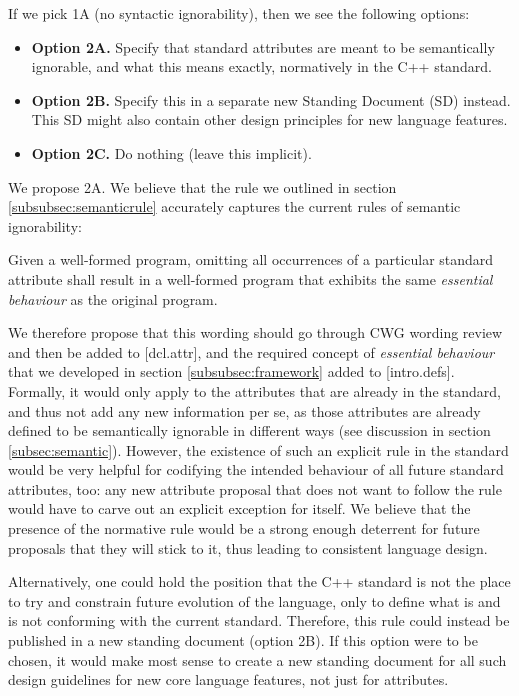 If we pick 1A (no syntactic ignorability), then we see the following options:

\begin{itemize}
\item \textbf{Option 2A.} Specify that standard attributes are meant to be semantically ignorable, and what this means exactly, normatively in the C++ standard.
\item \textbf{Option 2B.} Specify this in a separate new Standing Document (SD) instead. This SD might also contain other design principles for new language features.
\item \textbf{Option 2C.} Do nothing (leave this implicit).
\end{itemize}

We propose 2A. We believe that the rule we outlined in section \ref{subsubsec:semanticrule} accurately captures the current rules of semantic ignorability:
\begin{adjustwidth}{0.5cm}{0.5cm}
Given a well-formed program, omitting all occurrences of a particular standard attribute shall result in a well-formed program that exhibits the same \emph{essential behaviour} as the original program.
\end{adjustwidth}
We therefore propose that this wording should go through CWG wording review and then be added to [dcl.attr], and the required concept of \emph{essential behaviour} that we developed in section \ref{subsubsec:framework} added to [intro.defs]. Formally, it would only apply to the attributes that are already in the standard, and thus not add any new information per se, as those attributes are already defined to be semantically ignorable in different ways (see discussion in section \ref{subsec:semantic}). However, the existence of such an explicit rule in the standard would be very helpful for codifying the intended behaviour of all future standard attributes, too: any new attribute proposal that does not want to follow the rule would have to carve out an explicit exception for itself. We believe that the presence of the normative rule would be a strong enough deterrent for future proposals that they will stick to it, thus leading to consistent language design.

Alternatively, one could hold the position that the C++ standard is not the place to try and constrain future evolution of the language, only to define what is and is not conforming with the current standard. Therefore, this rule could instead be published in a new standing document (option 2B). If this option were to be chosen, it would make most sense to create a new standing document for all such design guidelines for new core language features, not just for attributes.

